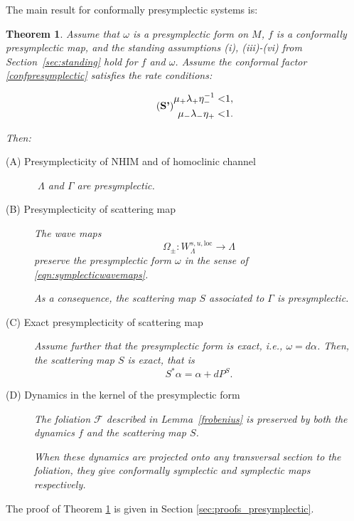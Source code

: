 \documentclass[11pt]{amsart}
\newtheorem{thm}{Theorem}[section]
\theoremstyle{definition}
\theoremstyle{remark}
\numberwithin{equation}{section}
\begin{document}
The main result for conformally presymplectic systems is:
\begin{thm}\label{mainpre}
Assume that $\omega$ is a presymplectic form on $M$, $f$  is a  conformally presymplectic map, and the standing assumptions (i), (iii)-(vi) from Section~\ref{sec:standing} hold for $f$ and $\omega$.
Assume the conformal factor \eqref{confpresymplectic} satisfies the rate conditions:

\begin{equation}\label{eqn:rates_conditions_pre}
\tag{{\bf S'}}
\begin{split}
\mu_+ \lambda_+ \eta_-^{-1}<&1,\\
\mu_- \lambda_-\eta_+<&1.\\
\end{split}
\end{equation}


Then:
\begin{description}
\item [(A) Presymplecticity of  NHIM and of homoclinic channel]{$ $}
$\Lambda$ and $\Gamma$ are presymplectic.
\item[(B) Presymplecticity of scattering map]
The wave maps
\[
\Omega_{\pm}:W^{s,u,\mathrm{loc}}_\Lambda\to\Lambda
\]
 preserve the presymplectic form $\omega$ in the sense of \eqref{eqn:symplecticwavemaps}.

As a consequence, the scattering map $S$ associated  to $\Gamma$  is presymplectic.
\item[(C) Exact presymplecticity of  scattering map]
Assume further that the presymplectic form is exact, i.e., $\omega = d\alpha$.
Then, the scattering map $S$ is exact, that is
\[
S^*\alpha =\alpha+dP^S .
\]
\item[(D) Dynamics in the kernel of the  presymplectic form]
The foliation  $\mathcal{F}$ described in
Lemma~\ref{frobenius} is preserved by both the dynamics $f$ and the scattering map $S$.

When these dynamics are projected onto any transversal section to the foliation, they give  conformally symplectic and symplectic  maps respectively.

\end{description}


\end{thm}

The proof of Theorem \ref{mainpre} is given in Section \ref{sec:proofs_presymplectic}.
\end{document}
